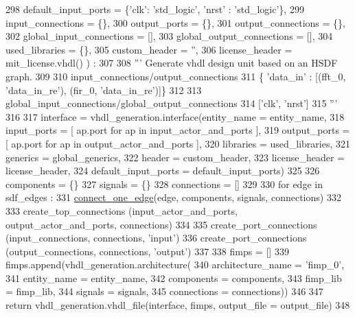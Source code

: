 \begin{DoxyCode}
298   default\_input\_ports = \{\textcolor{stringliteral}{'clk'}: \textcolor{stringliteral}{'std\_logic'}, \textcolor{stringliteral}{'nrst'} : \textcolor{stringliteral}{'std\_logic'}\},
299   input\_connections = \{\},
300   output\_ports = \{\},
301   output\_connections = \{\},
302   global\_input\_connections = [],
303   global\_output\_connections = [],
304   used\_libraries = \{\},
305   custom\_header = \textcolor{stringliteral}{''},
306   license\_header = mit\_license.vhdl() ) :
307 
308   \textcolor{stringliteral}{''' Generate vhdl design unit based on an HSDF graph.}
309 \textcolor{stringliteral}{}
310 \textcolor{stringliteral}{    input\_connections/output\_connections}
311 \textcolor{stringliteral}{      \{ 'data\_in' : [(fft\_0, 'data\_in\_re'), (fir\_0, 'data\_in\_re')]\}}
312 \textcolor{stringliteral}{}
313 \textcolor{stringliteral}{    global\_input\_connections/global\_output\_connections}
314 \textcolor{stringliteral}{      ['clk', 'nrst']}
315 \textcolor{stringliteral}{  '''}
316 
317   interface = vhdl\_generation.interface(entity\_name = entity\_name,
318     input\_ports = [ ap.port \textcolor{keywordflow}{for} ap \textcolor{keywordflow}{in} input\_actor\_and\_ports ],
319     output\_ports = [ ap.port \textcolor{keywordflow}{for} ap \textcolor{keywordflow}{in} output\_actor\_and\_ports ],
320     libraries = used\_libraries,
321     generics = global\_generics,
322     header = custom\_header,
323     license\_header = license\_header,
324     default\_input\_ports = default\_input\_ports)
325 
326   components = \{\}
327   signals = \{\}
328   connections = []
329 
330   \textcolor{keywordflow}{for} edge \textcolor{keywordflow}{in} sdf\_edges :
331     \hyperlink{namespacesylva_1_1code__generation_1_1hsdf__to__vhdl_a5976ee6a55f22e1fc1e9fc87bac3ea62}{connect\_one\_edge}(edge, components, signals, connections)
332 
333   create\_top\_connections (input\_actor\_and\_ports, output\_actor\_and\_ports, connections)
334 
335   create\_port\_connections (input\_connections, connections, \textcolor{stringliteral}{'input'})
336   create\_port\_connections (output\_connections, connections, \textcolor{stringliteral}{'output'})
337 
338   fimps = []
339   fimps.append(vhdl\_generation.architecture(
340     architecture\_name = \textcolor{stringliteral}{'fimp\_0'},
341     entity\_name = entity\_name,
342     components = components,
343     fimp\_lib = fimp\_lib,
344     signals = signals,
345     connections = connections))
346 
347   \textcolor{keywordflow}{return} vhdl\_generation.vhdl\_file(interface, fimps, output\_file = output\_file)
348 
\end{DoxyCode}


